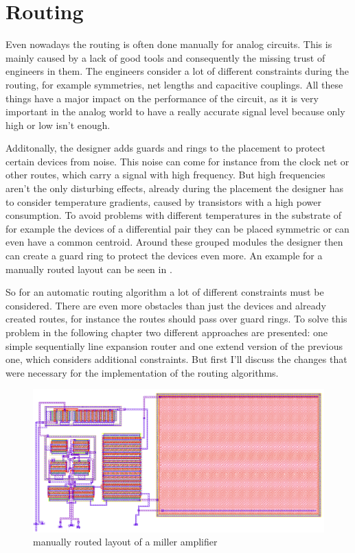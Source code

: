 \chapter{Routing}

Even nowadays the routing is often done manually for analog circuits. This is mainly caused by a lack of good tools and consequently the missing trust of engineers in them. The engineers consider a lot of different constraints during the routing, for example symmetries, net lengths and capacitive couplings. All these things have a major impact on the performance of the circuit, as it is very important in the analog world to have a really accurate signal level because only high or low isn't enough.

Additonally, the designer adds guards and rings to the placement to protect certain devices from noise. This noise can come for instance from the clock net or other routes, which carry a signal with high frequency. But high frequencies aren't the only disturbing effects, already during the placement the designer has to consider temperature gradients, caused by transistors with a high power consumption. To avoid problems with different temperatures in the substrate of for example the devices of a differential pair they can be placed symmetric or can even have a common centroid. Around these grouped modules the designer then can create a guard ring to protect the devices even more. An example for a manually routed layout can be seen in .

So for an automatic routing algorithm a lot of different constraints must be considered. There are even more obstacles than just the devices and already created routes, for instance the routes should pass over guard rings. To solve this problem in the following chapter two different approaches are presented: one simple sequentially line expansion router and one extend version of the previous one, which considers additional constraints. But first I'll  discuss the changes that were necessary for the implementation of the routing algorithms.

\begin{figure}
	\centering
	\includegraphics[scale=.4]{FIG/miller_amplifier_layout_routed.png}
  	\caption{manually routed layout of a miller amplifier}
	\label{fig:miller_amplifier_routed_layout}
\end{figure}

